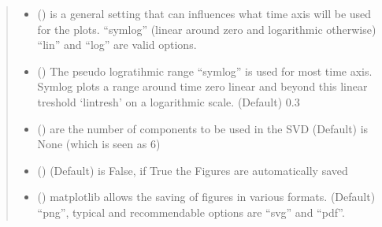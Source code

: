 \documentclass[letterpaper,10pt,english]{sphinxmanual}
\begin{document}
\begin{fulllineitems}
\begin{quote}
\begin{description}
\begin{itemize}
\item {} 
 () \textendash{} is a general setting that can influences what time axis will be used for the plots.
“symlog” (linear around zero and logarithmic otherwise) “lin” and “log” are valid options.

\item {} 
 () \textendash{} The pseudo logratihmic range “symlog” is used for most time axis. Symlog plots a range around
time zero linear and beyond this linear treshold ‘lintresh’ on a logarithmic scale. (Default) 0.3

\item {} 
 () \textendash{} are the number of components to be used in the SVD (Default) is None (which is seen as 6)

\item {} 
 (\sphinxstyleliteralemphasis{\sphinxupquote{, }}) \textendash{} (Default) is False, if True the Figures are automatically saved

\item {} 
 (\sphinxstyleliteralemphasis{\sphinxupquote{ (}}\sphinxstyleliteralemphasis{\sphinxupquote{)}}\sphinxstyleliteralemphasis{\sphinxupquote{, }}) \textendash{} matplotlib allows the saving of figures in various formats. (Default) “png”,
typical and recommendable options are “svg” and “pdf”.


\end{itemize}
\end{description}
\end{quote}
\end{fulllineitems}
\end{document}
